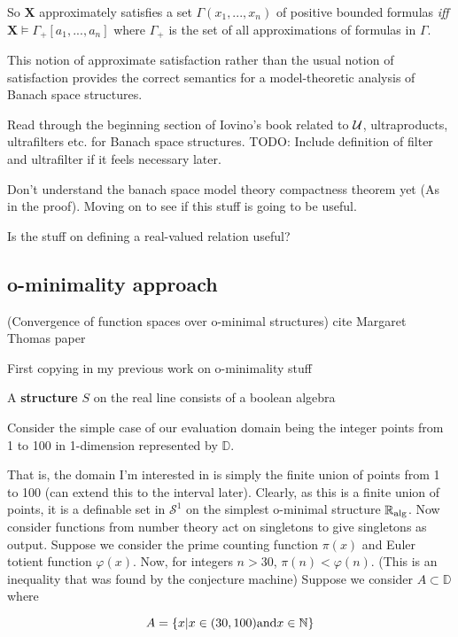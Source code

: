 \begin{definition}
So $\mathbf{X}$ approximately satisfies a set $\Gamma(x_1,...,x_n)$ of positive bounded formulas \textit{iff} $\mathbf{X}\models\Gamma_{+}[a_1,...,a_n]$ where $\Gamma_{+}$ is the set of all approximations of formulas in $\Gamma$.
\begin{remark}
    This notion of approximate satisfaction rather than the usual notion of satisfaction provides the correct semantics for a model-theoretic analysis of Banach space structures.
\end{remark}

Read through the beginning section of Iovino's book related to $\mathcal{U}$, ultraproducts, ultrafilters etc. for Banach space structures.
TODO: Include definition of filter and ultrafilter if it feels necessary later.

Don't understand the banach space model theory compactness theorem yet (As in the proof). Moving on to see if this stuff is going to be useful.

Is the stuff on defining a real-valued relation useful?
\subsection{o-minimality approach}

(Convergence of function spaces over o-minimal structures) cite Margaret Thomas paper

First copying in my previous work on o-minimality stuff

\begin{definition}[Structure]
    A \textbf{structure} $S$ on the real line consists of a boolean algebra
\end{definition}

Consider the simple case of our evaluation domain being the integer points from 1 to 100 in 1-dimension represented by $\mathbb{D}$.

That is, the domain I'm interested in is simply the finite union of points from 1 to 100 (can extend this to the interval later). Clearly, as this is a finite union of points, it is a definable set in $\mathcal{S}^1$ on the simplest o-minimal structure $\mathbb{R}_{\text{alg}}$.
Now consider functions from number theory act on singletons to give singletons as output. Suppose we consider the prime counting function $\pi(x)$ and Euler totient function $\varphi(x)$. Now, for integers $n > 30$, $\pi(n) < \varphi(n)$. (This is an inequality that was found by the conjecture machine)
Suppose we consider $A\subset\mathbb{D}$ where

\begin{equation*}
    A = \{x | x\in (30, 100) \text{and} x\in\mathbb{N} \}
\end{equation*}


\end{definition}

